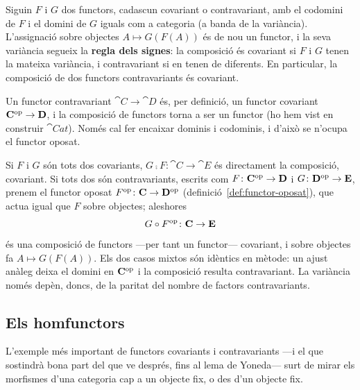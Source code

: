 \begin{proposicio}\label{prop:variancia-composicio}
Siguin $F$ i $G$ dos functors, cadascun covariant o contravariant, amb el codomini de $F$ i el domini de $G$ iguals com a categoria (a banda de la variància). L'assignació sobre objectes $A\mapsto G(F(A))$ és de nou un functor, i la seva variància segueix la \textbf{regla dels signes}: la composició és covariant si $F$ i $G$ tenen la mateixa variància, i contravariant si en tenen de diferents. En particular, la composició de dos functors contravariants és covariant.
\end{proposicio}

\begin{prova}
Un functor contravariant $\cat{C}\to\cat{D}$ és, per definició, un functor covariant $\mathbf{C}^{\mathrm{op}}\to\mathbf{D}$, i la composició de functors torna a ser un functor (ho hem vist en construir $\cat{Cat}$). Només cal fer encaixar dominis i codominis, i d'això se n'ocupa el functor oposat.

Si $F$ i $G$ són tots dos covariants, $G\comp F\colon\cat{C}\to\cat{E}$ és directament la composició, covariant. Si tots dos són contravariants, escrits com $F\colon\mathbf{C}^{\mathrm{op}}\to\mathbf{D}$ i $G\colon\mathbf{D}^{\mathrm{op}}\to\mathbf{E}$, prenem el functor oposat $F^{\mathrm{op}}\colon\mathbf{C}\to\mathbf{D}^{\mathrm{op}}$ (definició~\ref{def:functor-oposat}), que actua igual que $F$ sobre objectes; aleshores
\[
G\circ F^{\mathrm{op}}\colon\mathbf{C}\to\mathbf{E}
\]
és una composició de functors ---per tant un functor--- covariant, i sobre objectes fa $A\mapsto G(F(A))$. Els dos casos mixtos són idèntics en mètode: un ajust anàleg deixa el domini en $\mathbf{C}^{\mathrm{op}}$ i la composició resulta contravariant. La variància només depèn, doncs, de la paritat del nombre de factors contravariants.
\end{prova}

\subsection{Els homfunctors}\label{subsec:homfunctors}

L'exemple més important de functors covariants i contravariants ---i el que sostindrà bona part del que ve després, fins al lema de Yoneda--- surt de mirar els morfismes d'una categoria cap a un objecte fix, o des d'un objecte fix.

